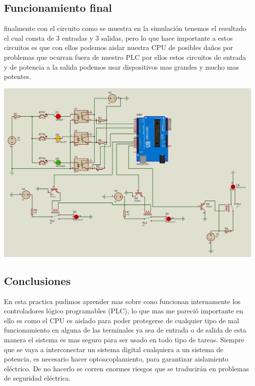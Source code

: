 \documentclass[12pt,a4paper]{article}
\begin{document}
\subsection{Funcionamiento final}
\begin{flushleft}
finalmente con el circuito como se muestra en la simulación tenemos el resultado el cual consta de 3 entradas y 3 salidas, pero lo que hace importante a estos circuitos es que con ellos podemos aislar nuestra CPU de posibles daños por problemas que ocurran fuera de nuestro PLC por ellos estos circuitos de entrada y de potencia a la salida podemos usar dispositivos mas grandes y mucho mas potentes. 
\linebreak
\linebreak
\end{flushleft}
\includegraphics[scale=0.15]{imagenes/simu0.JPG}
\newpage
\subsection{Conclusiones}
\begin{flushleft}
En esta practica pudimos aprender mas sobre cono funcionan internamente los controladores lógico programables (PLC), lo que mas me pareció importante en ello es como el CPU es aislado para poder protegerse de cualquier tipo de mal funcionamiento en alguna de las terminales ya sea de entrada o de salida de esta manera el sistema es mas seguro para ser usado en todo tipo de tareas.
Siempre que se vaya a interconectar un sistema digital cualquiera a un sistema de potencia, es necesario hacer optoacoplamiento, para garantizar aislamiento eléctrico. De no hacerlo se corren enormes riesgos que se traducirán en problemas de seguridad eléctrica.
\end{flushleft}
\end{document}
